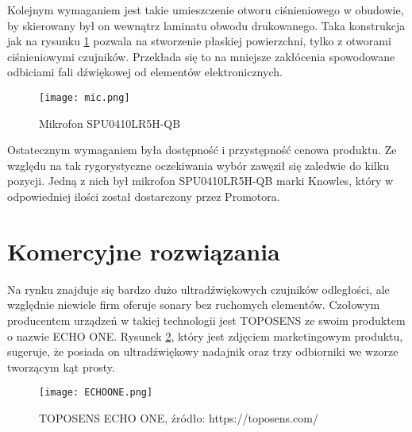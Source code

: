 \noindent
\vspace{2cm}

Kolejnym wymaganiem jest takie umieszczenie otworu ciśnieniowego w obudowie, by skierowany był on wewnątrz laminatu obwodu drukowanego. 
Taka konstrukcja jak na rysunku \ref{fig:mic} pozwala na stworzenie płaskiej powierzchni, tylko z otworami ciśnieniowymi czujników. 
Przekłada się to na mniejsze zakłócenia spowodowane odbiciami fali dźwiękowej od elementów elektronicznych.

\begin{figure}[ht!]
    \centering
    \texttt{[image: mic.png]}
    \caption{Mikrofon SPU0410LR5H-QB}
    \label{fig:mic}
\end{figure}
\noindent
Ostatecznym wymaganiem była dostępność i przystępność cenowa produktu. Ze względu na tak rygorystyczne oczekiwania wybór zawęził się zaledwie do kilku pozycji.
Jedną z nich był mikrofon SPU0410LR5H-QB marki Knowles\cite{knowles}, który w odpowiedniej ilości został dostarczony przez Promotora.
\vspace{2cm}



\section{Komercyjne rozwiązania}
Na rynku znajduje się bardzo dużo ultradźwiękowych czujników odległości, ale względnie niewiele firm oferuje sonary bez ruchomych elementów.
Czołowym producentem urządzeń w takiej technologii jest TOPOSENS ze swoim produktem o nazwie ECHO ONE\textregistered.
Rysunek \ref*{fig:echoone}, który jest zdjęciem marketingowym produktu, sugeruje, że posiada on ultradźwiękowy nadajnik oraz trzy odbiorniki we wzorze tworzącym kąt prosty.

\begin{figure}[ht!]
    \centering
    \texttt{[image: ECHOONE.png]}
    \caption{TOPOSENS ECHO ONE, źródło: https://toposens.com/}
    \label{fig:echoone}
\end{figure}
